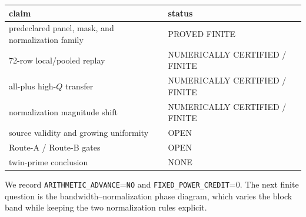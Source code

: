\documentclass[10pt]{article}
\begin{document}
\begin{center}
\small
\begin{tabular}{ll}
\toprule
claim & status\\
\midrule
predeclared panel, mask, and normalization family & PROVED FINITE\\
72-row local/pooled replay & NUMERICALLY CERTIFIED / FINITE\\
all-plus high-\(Q\) transfer & NUMERICALLY CERTIFIED / FINITE\\
normalization magnitude shift & NUMERICALLY CERTIFIED / FINITE\\
source validity and growing uniformity & OPEN\\
Route-A / Route-B gates & OPEN\\
twin-prime conclusion & NONE\\
\bottomrule
\end{tabular}
\end{center}

We record \texttt{ARITHMETIC\_ADVANCE}=\texttt{NO} and
\texttt{FIXED\_POWER\_CREDIT}=0.  The next finite question is the
bandwidth--normalization phase diagram, which varies the block band while
keeping the two normalization rules explicit.
\end{document}
